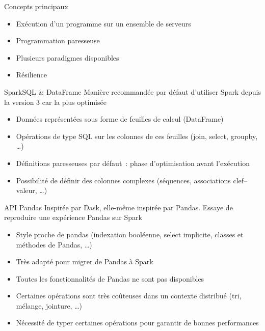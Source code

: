 \begin{frame}{Concepts principaux}
  \begin{itemize}
    \item Exécution d'un programme sur un ensemble de serveurs
    \item Programmation paresseuse
    \item Plusieurs paradigmes disponibles
    \item Résilience
  \end{itemize}
\end{frame}

\begin{frame}{SparkSQL \& DataFrame}
  Manière recommandée par défaut d'utiliser Spark depuis la version 3 car la plus optimisée

  \begin{itemize}
    \item Données représentées sous forme de feuilles de calcul (DataFrame)
    \item Opérations de type SQL sur les colonnes de ces feuilles (join, select, groupby, …)
    \item Définitions paresseuses par défaut~: phase d'optimisation avant l'exécution
    \item Possibilité de définir des colonnes complexes (séquences, associations clef–valeur, …)
  \end{itemize}
\end{frame}

\begin{frame}{API Pandas}
  Inspirée par Dask, elle-même inspirée par Pandas. Essaye de reproduire une expérience Pandas sur Spark

  \begin{itemize}
    \item Style proche de pandas (indexation booléenne, select implicite, classes et méthodes de Pandas, …)
    \item Très adapté pour migrer de Pandas à Spark
    \item Toutes les fonctionnalités de Pandas ne sont pas disponibles
    \item Certaines opérations sont très coûteuses dans un contexte distribué (tri, mélange, jointure, …)
    \item Nécessité de typer certaines opérations pour garantir de bonnes performances
  \end{itemize}

\end{frame}

